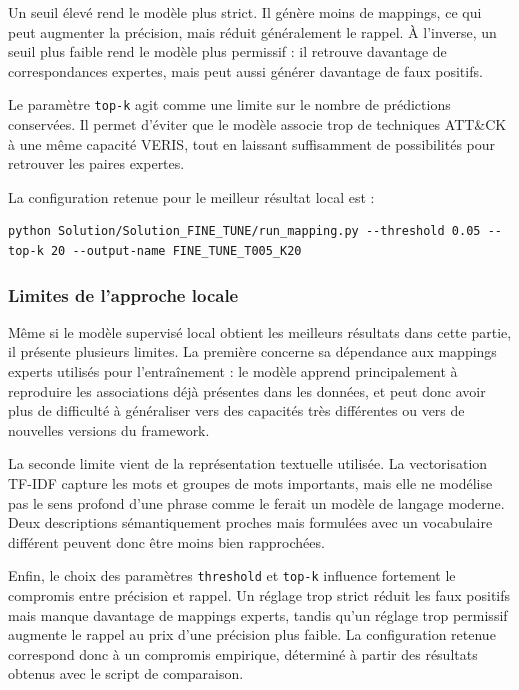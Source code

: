 \documentclass[a4paper,12pt]{article}
\begin{document}
Un seuil élevé rend le modèle plus strict. Il génère moins de mappings, ce qui peut augmenter la précision, mais réduit généralement le rappel. À l'inverse, un seuil plus faible rend le modèle plus permissif : il retrouve davantage de correspondances expertes, mais peut aussi générer davantage de faux positifs.

Le paramètre \texttt{top-k} agit comme une limite sur le nombre de prédictions conservées. Il permet d'éviter que le modèle associe trop de techniques ATT\&CK à une même capacité VERIS, tout en laissant suffisamment de possibilités pour retrouver les paires expertes.

La configuration retenue pour le meilleur résultat local est :

\begin{verbatim}
python Solution/Solution_FINE_TUNE/run_mapping.py --threshold 0.05 --top-k 20 --output-name FINE_TUNE_T005_K20
\end{verbatim}

\subsubsection{Limites de l'approche locale}

Même si le modèle supervisé local obtient les meilleurs résultats dans cette partie, il présente plusieurs limites. La première concerne sa dépendance aux mappings experts utilisés pour l'entraînement : le modèle apprend principalement à reproduire les associations déjà présentes dans les données, et peut donc avoir plus de difficulté à généraliser vers des capacités très différentes ou vers de nouvelles versions du framework.

La seconde limite vient de la représentation textuelle utilisée. La vectorisation TF-IDF capture les mots et groupes de mots importants, mais elle ne modélise pas le sens profond d'une phrase comme le ferait un modèle de langage moderne. Deux descriptions sémantiquement proches mais formulées avec un vocabulaire différent peuvent donc être moins bien rapprochées.

Enfin, le choix des paramètres \texttt{threshold} et \texttt{top-k} influence fortement le compromis entre précision et rappel. Un réglage trop strict réduit les faux positifs mais manque davantage de mappings experts, tandis qu'un réglage trop permissif augmente le rappel au prix d'une précision plus faible. La configuration retenue correspond donc à un compromis empirique, déterminé à partir des résultats obtenus avec le script de comparaison.
\end{document}
